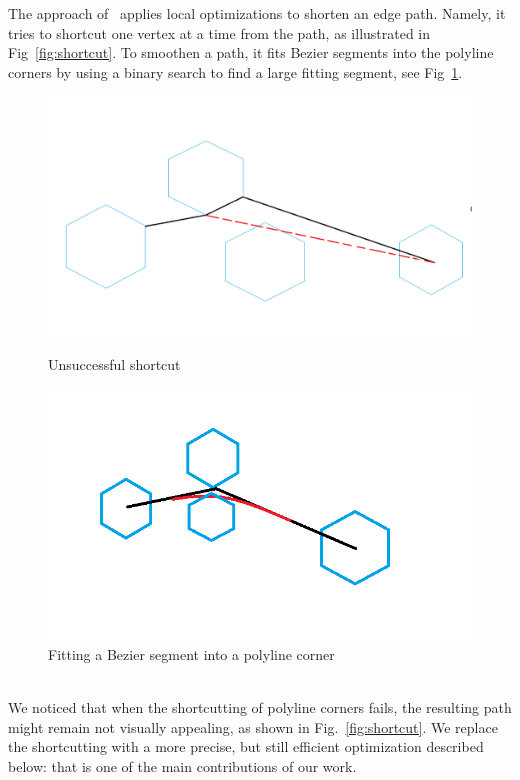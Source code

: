 \documentclass{gd-llncs}
\begin{document}
The approach of~\cite{dwyer2010fast} applies local optimizations to shorten an edge path.
Namely, it tries to shortcut one vertex at a time from the path, as illustrated in Fig~\ref{fig:shortcut}.
To smoothen a path, it fits Bezier segments into the polyline corners by
using a binary search to find a large fitting segment, see Fig~\ref{fig:cornerfit}.
\begin{figure}[!tbp]
  \centering
  \begin{minipage}[b]{0.4\textwidth}
    \includegraphics[width=\textwidth]{./naive_shorcut_now_working.png}
    \caption{Unsuccessful shortcut}
    \label{fig:shortcut}
  \end{minipage}
  \hfill
  \begin{minipage}[b]{0.4\textwidth}
    \includegraphics[width=\textwidth]{fillet_corner.png}
    \caption{Fitting a Bezier segment into a polyline corner}
    \label{fig:cornerfit}
  \end{minipage}
\end{figure}
\\
We noticed that when the shortcutting of polyline corners fails, the resulting path might remain not visually appealing, as shown in Fig.~\ref{fig:shortcut}.
We replace the shortcutting with a more precise, but still efficient optimization described below: that is one of the main contributions of our work.
\end{document}
